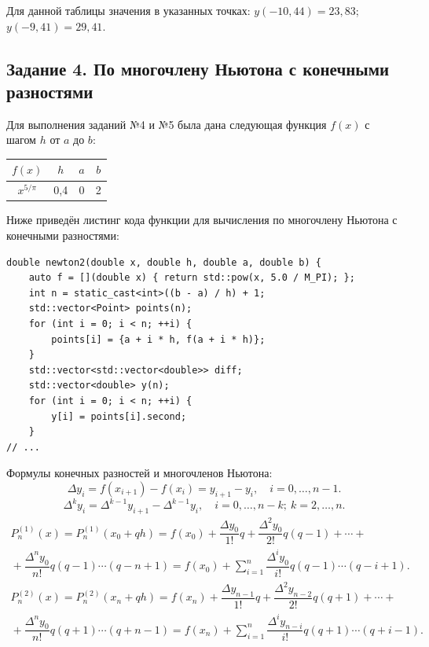 \documentclass[14pt,a4paper]{extarticle}
\begin{document}
	Для данной таблицы значения в указанных точках: $y(-10,44) = 23,83$; $y(-9,41) = 29,41$.
	
	\subsection{Задание 4. По многочлену Ньютона с конечными разностями}
	Для выполнения заданий №4 и №5 была дана следующая функция $f(x)$ с шагом $h$ от $a$ до $b$:
	
	\begin{table}[h]
		\centering
		\begin{tabular}{|c|c|c|c|}
			\hline
			$f(x)$ & $h$ & $a$ & $b$ \\ \hline
			$x^{5/\pi}$ & 0,4 & 0 & 2 \\ \hline
		\end{tabular}
	\end{table}
	
	Ниже приведён листинг кода функции для вычисления по многочлену Ньютона с конечными разностями:
	
	\begin{lstlisting}
double newton2(double x, double h, double a, double b) {
	auto f = [](double x) { return std::pow(x, 5.0 / M_PI); };
	int n = static_cast<int>((b - a) / h) + 1;
	std::vector<Point> points(n);
	for (int i = 0; i < n; ++i) {
		points[i] = {a + i * h, f(a + i * h)};
	}
	std::vector<std::vector<double>> diff;
	std::vector<double> y(n);
	for (int i = 0; i < n; ++i) {
		y[i] = points[i].second;
	}
// ...
	\end{lstlisting}
	
	\noindent Формулы конечных разностей и многочленов Ньютона:
	\[
		\Delta y_i=f(x_{i+1})-f(x_i)=y_{i+1}-y_i,\quad i=0,\ldots,n-1.
	\]
	\[
		\Delta^k y_i=\Delta^{k-1}y_{i+1}-\Delta^{k-1}y_i,
		\quad i=0,\ldots,n-k;\ k=2,\ldots,n.
	\]
	\begin{multline*}
		P_n^{(1)}(x)=P_n^{(1)}(x_0+qh)=f(x_0)+\dfrac{\Delta y_0}{1!}q+
		\dfrac{\Delta^2 y_0}{2!}q(q-1)+\cdots+\\
		{}+\dfrac{\Delta^n y_0}{n!}q(q-1)\cdots(q-n+1)
		=f(x_0)+\sum_{i=1}^{n}\dfrac{\Delta^i y_0}{i!}q(q-1)\cdots(q-i+1).
	\end{multline*}
	\begin{multline*}
		P_n^{(2)}(x)=P_n^{(2)}(x_n+qh)=f(x_n)+\dfrac{\Delta y_{n-1}}{1!}q+
		\dfrac{\Delta^2 y_{n-2}}{2!}q(q+1)+\cdots+\\
		{}+\dfrac{\Delta^n y_0}{n!}q(q+1)\cdots(q+n-1)
		=f(x_n)+\sum_{i=1}^{n}\dfrac{\Delta^i y_{n-i}}{i!}q(q+1)\cdots(q+i-1).
	\end{multline*}
	
\end{document}
